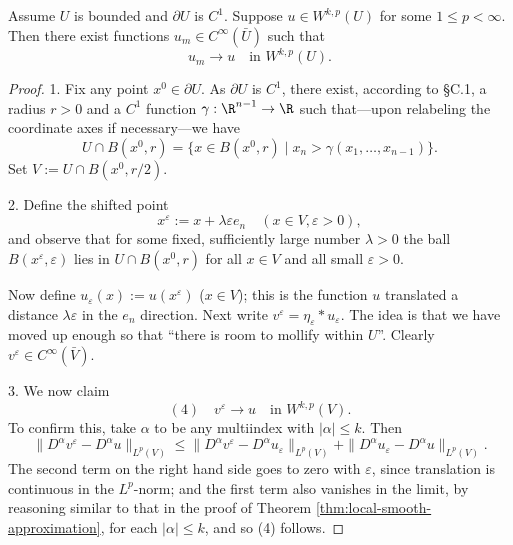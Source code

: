 \begin{theorem}
\label{thm:global-smooth-approximation-boundary}
Assume $U$ is bounded and $\partial U$ is $C^1$. Suppose $u \in W^{k,p}(U)$ for some $1 \le p < \infty$. Then there exist functions $u_m \in C^\infty(\bar U)$ such that
$$u_m \to u \quad \text{in } W^{k,p}(U).$$
\end{theorem}

\begin{proof}
1. Fix any point $x^0 \in \partial U$. As $\partial U$ is $C^1$, there exist, according to §C.1, a radius $r > 0$ and a $C^1$ function $\gamma : \R^{n-1} \to \R$ such that---upon relabeling the coordinate axes if necessary---we have
$$U \cap B(x^0, r) = \{x \in B(x^0, r) \mid x_n > \gamma(x_1, \ldots, x_{n-1})\}.$$
Set $V := U \cap B(x^0, r/2)$.

2. Define the shifted point
$$x^\varepsilon := x + \lambda \varepsilon e_n \quad (x \in V, \varepsilon > 0),$$
and observe that for some fixed, sufficiently large number $\lambda > 0$ the ball $B(x^\varepsilon, \varepsilon)$ lies in $U \cap B(x^0, r)$ for all $x \in V$ and all small $\varepsilon > 0$.

\begin{figure}[h]\centering
\end{figure}

Now define $u_\varepsilon(x) := u(x^\varepsilon)$ ($x \in V$); this is the function $u$ translated a distance $\lambda\varepsilon$ in the $e_n$ direction. Next write $v^\varepsilon = \eta_\varepsilon * u_\varepsilon$. The idea is that we have moved up enough so that ``there is room to mollify within $U$''. Clearly $v^\varepsilon \in C^\infty(\bar V)$.

3. We now claim
$$(4) \quad v^\varepsilon \to u \quad \text{in } W^{k,p}(V).$$
To confirm this, take $\alpha$ to be any multiindex with $|\alpha| \le k$. Then
$$\|D^\alpha v^\varepsilon - D^\alpha u\|_{L^p(V)} \le \|D^\alpha v^\varepsilon - D^\alpha u_\varepsilon\|_{L^p(V)} + \|D^\alpha u_\varepsilon - D^\alpha u\|_{L^p(V)}.$$
The second term on the right hand side goes to zero with $\varepsilon$, since translation is continuous in the $L^p$-norm; and the first term also vanishes in the limit, by reasoning similar to that in the proof of Theorem \ref{thm:local-smooth-approximation}, for each $|\alpha| \le k$, and so (4) follows.


\end{proof}
